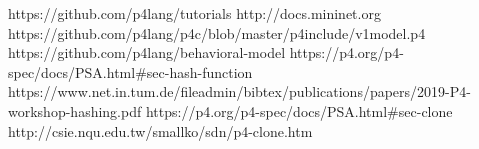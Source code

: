 \documentclass[sigconf,natbib=false]{acmart}
\begin{document}
\begin{thebibliography}{2}
 https://github.com/p4lang/tutorials
 http://docs.mininet.org
 https://github.com/p4lang/p4c/blob/master/p4include/v1model.p4
 https://github.com/p4lang/behavioral-model
 https://p4.org/p4-spec/docs/PSA.html\#sec-hash-function
 https://www.net.in.tum.de/fileadmin/bibtex/publications/papers/2019-P4-workshop-hashing.pdf
 https://p4.org/p4-spec/docs/PSA.html\#sec-clone
 http://csie.nqu.edu.tw/smallko/sdn/p4-clone.htm

\end{thebibliography}


\end{document}
